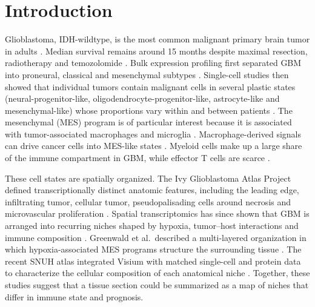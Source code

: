 \documentclass[11pt,letterpaper]{article}
\begin{document}
\begin{abstract}
\noindent\textbf{Conclusions.} In GBM Visium data, spatial graph structure did not significantly improve supervised niche or histology prediction over matched graph-free models. We release the pipeline and all run results, and recommend tuned graph-free baselines, patient-level cross-validation and independent histological labels as minimum standards for spatial deep-learning claims.

\vspace{0.5em}
\begingroup\sloppy
\noindent\textbf{Keywords:} glioblastoma; spatial transcriptomics; Visium; graph neural network; benchmarking; neuropathology; tumor microenvironment; mesenchymal state; reproducibility\par\endgroup
\end{abstract}

\vspace{1em}

\section{Introduction}

Glioblastoma, IDH-wildtype, is the most common malignant primary brain tumor in adults \cite{ostrom2023,louis2021}. Median survival remains around 15 months despite maximal resection, radiotherapy and temozolomide \cite{stupp2005}. Bulk expression profiling first separated GBM into proneural, classical and mesenchymal subtypes \cite{verhaak2010,tcga2008}. Single-cell studies then showed that individual tumors contain malignant cells in several plastic states (neural-progenitor-like, oligodendrocyte-progenitor-like, astrocyte-like and mesenchymal-like) whose proportions vary within and between patients \cite{neftel2019}. The mesenchymal (MES) program is of particular interest because it is associated with tumor-associated macrophages and microglia \cite{wang2017}. Macrophage-derived signals can drive cancer cells into MES-like states \cite{hara2021}. Myeloid cells make up a large share of the immune compartment in GBM, while effector T cells are scarce \cite{klemm2020,pomboantunes2021,khan2023,decordova2020,lin2024}.

These cell states are spatially organized. The Ivy Glioblastoma Atlas Project defined transcriptionally distinct anatomic features, including the leading edge, infiltrating tumor, cellular tumor, pseudopalisading cells around necrosis and microvascular proliferation \cite{puchalski2018}. Spatial transcriptomics \cite{stahl2016,moses2022} has since shown that GBM is arranged into recurring niches shaped by hypoxia, tumor--host interactions and immune composition \cite{ravi2022,greenwald2024,ruizmoreno2025}. Greenwald et al.\ described a multi-layered organization in which hypoxia-associated MES programs structure the surrounding tissue \cite{greenwald2024}. The recent SNUH atlas integrated Visium with matched single-cell and protein data to characterize the cellular composition of each anatomical niche \cite{park2026}. Together, these studies suggest that a tissue section could be summarized as a map of niches that differ in immune state and prognosis.
\end{document}
